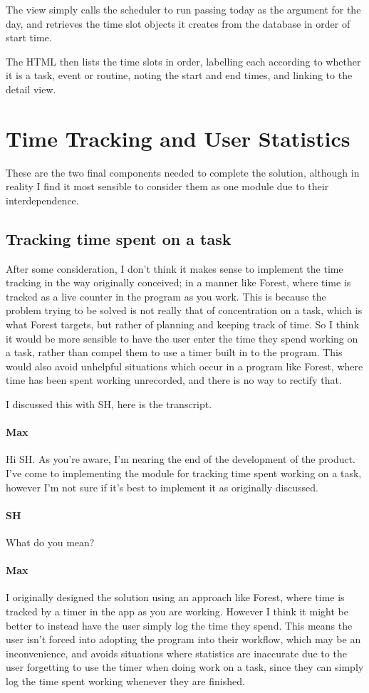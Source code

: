 \documentclass{article}
\begin{document}
The view simply calls the scheduler to run passing today as the argument for the day,
and retrieves the time slot objects it creates from the database in order of start time.

The HTML then lists the time slots in order,
labelling each according to whether it is a task, event or routine,
noting the start and end times,
and linking to the detail view.

\section{Time Tracking and User Statistics}
These are the two final components needed to complete the solution,
although in reality I find it most sensible to consider them as one module due to their interdependence.

\subsection{Tracking time spent on a task}
After some consideration,
I don't think it makes sense to implement the time tracking in the way originally conceived;
in a manner like Forest,
where time is tracked as a live counter in the program as you work.
This is because the problem trying to be solved is not really that of concentration on a task,
which is what Forest targets,
but rather of planning and keeping track of time.
So I think it would be more sensible to have the user enter the time they spend working on a task,
rather than compel them to use a timer built in to the program.
This would also avoid unhelpful situations which occur in a program like Forest,
where time has been spent working unrecorded,
and there is no way to rectify that.

I discussed this with SH,
here is the transcript.

\paragraph{Max} Hi SH.
As you're aware,
I'm nearing the end of the development of the product.
I've come to implementing the module for tracking time spent working on a task,
however I'm not sure if it's best to implement it as originally discussed.
\paragraph{SH} What do you mean?
\paragraph{Max} I originally designed the solution using an approach like Forest,
where time is tracked by a timer in the app as you are working.
However I think it might be better to instead have the user simply log the time they spend.
This means the user isn't forced into adopting the program into their workflow,
which may be an inconvenience,
and avoids situations where statistics are inaccurate due to the user forgetting to use the timer when doing work on a task,
since they can simply log the time spent working whenever they are finished.
\end{document}
